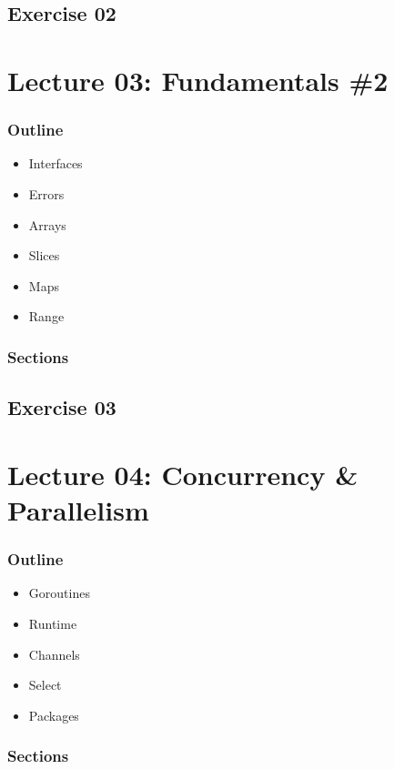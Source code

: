 \documentclass[
  digital,
  color,
  oneside,
  nosansbold,
  nocolorbold,
  lof,
  lot,
]{fithesis4}
\begin{document}
\subsection{Exercise 02}

\section{Lecture 03: Fundamentals \#2}

\subsubsection{Outline}

\begin{itemize}
    \item Interfaces
    \item Errors
    \item Arrays
    \item Slices
    \item Maps
    \item Range
\end{itemize}

\subsubsection{Sections}

\subsection{Exercise 03}

\section{Lecture 04: Concurrency \& Parallelism}

\subsubsection{Outline}

\begin{itemize}
    \item Goroutines
    \item Runtime
    \item Channels
    \item Select
    \item Packages
\end{itemize}

\subsubsection{Sections}
\end{document}
